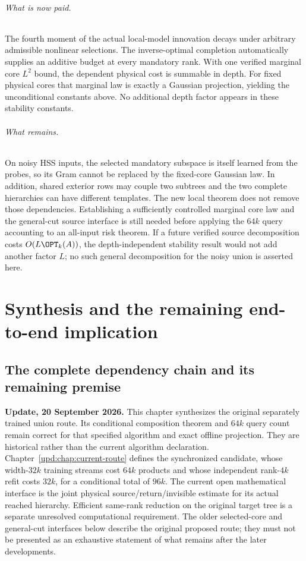 \documentclass[11pt,oneside,openany,a4paper]{book}
\numberwithin{equation}{chapter}
\theoremstyle{definition}
\theoremstyle{remark}
\begin{document}
\paragraph{What is now paid.}
The fourth moment of the actual local-model innovation decays under arbitrary admissible nonlinear selections. The inverse-optimal completion automatically supplies an additive budget at every mandatory rank. With one verified marginal core $L^2$ bound, the dependent physical cost is summable in depth. For fixed physical cores that marginal law is exactly a Gaussian projection, yielding the unconditional constants above. No additional depth factor appears in these stability constants.

\paragraph{What remains.}
On noisy HSS inputs, the selected mandatory subspace is itself learned from the probes, so its Gram cannot be replaced by the fixed-core Gaussian law. In addition, shared exterior rows may couple two subtrees and the two complete hierarchies can have different templates. The new local theorem does not remove those dependencies. Establishing a sufficiently controlled marginal core law and the general-cut source interface is still needed before applying the $64k$ query accounting to an all-input risk theorem. If a future verified source decomposition costs $O(L\OPT_k(A))$, the depth-independent stability result would not add another factor $L$; no such general decomposition for the noisy union is asserted here.

\endgroup

\part{Synthesis and the remaining end-to-end implication}

\begingroup
\chapter{The complete dependency chain and its remaining premise}\label{ch:synthesis}
\begin{scopebox}
\textbf{Update, 20 September 2026.} This chapter synthesizes the original separately trained union route. Its conditional composition theorem and $64k$ query count remain correct for that specified algorithm and exact offline projection. They are historical rather than the current algorithm declaration. Chapter~\ref{upd:chap:current-route} defines the synchronized candidate, whose width-$32k$ training streams cost $64k$ products and whose independent rank-$4k$ refit costs $32k$, for a conditional total of $96k$. The current open mathematical interface is the joint physical source/return/invisible estimate for its actual reached hierarchy. Efficient same-rank reduction on the original target tree is a separate unresolved computational requirement. The older selected-core and general-cut interfaces below describe the original proposed route; they must not be presented as an exhaustive statement of what remains after the later developments.
\end{scopebox}
\end{document}

